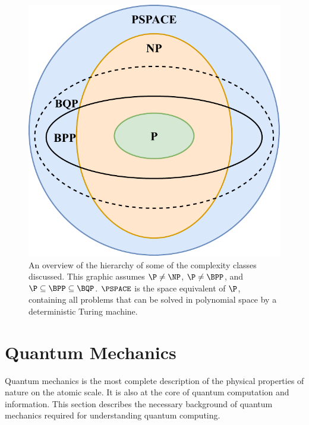 \begin{figure}[ht]
    \centering
    \includegraphics[width=0.375\linewidth]{figures/complexity-classes-hierarchy.pdf}
    \caption[An overview of the hierarchy of some of the complexity classes discussed.]{
        An overview of the hierarchy of some of the complexity classes discussed.
        This graphic assumes $\P \neq \NP$, $\P \neq \BPP$, and $\P \subseteq \BPP \subseteq \BQP$.
        $\PSPACE$ is the space equivalent of $\P$, containing all problems that can be solved in polynomial space by a deterministic Turing machine.
    }
    \label{fig:complexity-classes-hierarchy}
\end{figure}

\section{Quantum Mechanics}
Quantum mechanics is the most complete description of the physical properties of nature on the atomic scale.
It is also at the core of quantum computation and information.
This section describes the necessary background of quantum mechanics required for understanding quantum computing.

